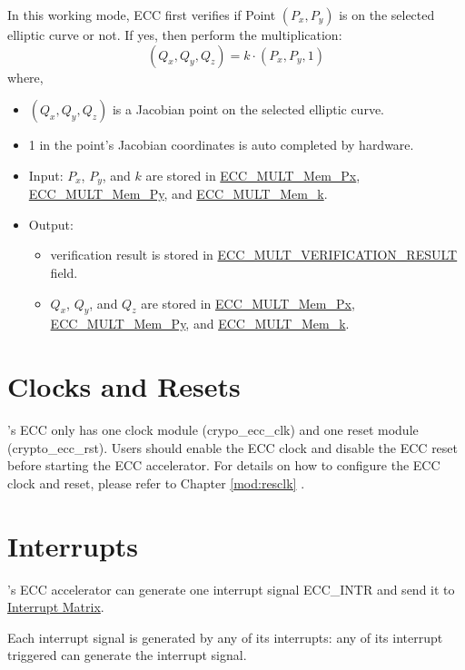 \documentclass[main\_\_EN.tex]{subfiles}
\begin{document}
In this working mode, ECC first verifies if Point $(P_x,P_y)$ is on the selected elliptic curve or not. If yes, then perform the multiplication:
\[
(Q_x,Q_y,Q_z) = k \cdot (P_x,P_y,1)
\]
where,
\begin{itemize}
    \item $(Q_x,Q_y,Q_z)$ is a Jacobian point on the selected elliptic curve.
    \item 1 in the point's Jacobian coordinates is auto completed by hardware.
    \item Input: $P_x$, $P_y$, and $k$ are stored in \hyperref[tab:ecc-memory]{ECC\_MULT\_Mem\_Px}, \hyperref[tab:ecc-memory]{ECC\_MULT\_Mem\_Py}, and \hyperref[tab:ecc-memory]{ECC\_MULT\_Mem\_k}.
    \item Output:
    \begin{itemize}
        \item verification result is stored in  \hyperref[fielddesc:ECCMULTVERIFICATIONRESULT]{ECC\_MULT\_VERIFICATION\_RESULT} field.
        \item $Q_x$, $Q_y$, and $Q_z$ are stored in \hyperref[tab:ecc-memory]{ECC\_MULT\_Mem\_Px}, \hyperref[tab:ecc-memory]{ECC\_MULT\_Mem\_Py}, and \hyperref[tab:ecc-memory]{ECC\_MULT\_Mem\_k}.
    \end{itemize}
\end{itemize}

\section{Clocks and Resets}
\chipname{}'s ECC only has one clock module (crypo\_ecc\_clk) and one reset module (crypto\_ecc\_rst). Users should enable the ECC clock and disable the ECC reset before starting the ECC accelerator. For details on how to configure the ECC clock and reset, please refer to Chapter \ref{mod:resclk} \textit{}.


\section{Interrupts}
\label{sec:ecc-interrupt}
\chipname{}'s ECC accelerator can generate one interrupt signal ECC\_INTR and send it to \hyperref[mod:intmtrx]{Interrupt Matrix}.

\begin{tiplisting}
Each interrupt signal is generated by any of its interrupts: any of its interrupt triggered can generate the interrupt signal.
\end{tiplisting}
\end{document}
